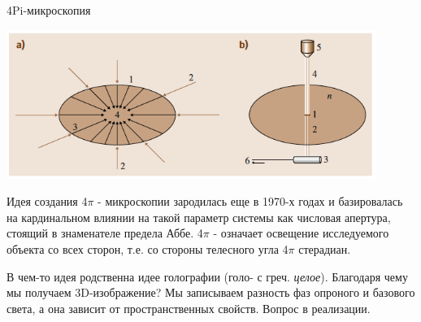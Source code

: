 \documentclass[9pt, compress, xcolor=table]{beamer}
\begin{document}
\begin{frame}{4Pi-микроскопия}
\begin{center}
\includegraphics[width=0.9\textwidth]{ffm01}

Идея создания 4$\pi$ - микроскопии зародилась еще в 1970-х годах и базировалась на кардинальном влиянии на такой параметр системы как числовая апертура, стоящий в знаменателе предела Аббе. 4$\pi$ - означает освещение исследуемого объекта со всех сторон, т.е. со стороны телесного угла 4$\pi$ стерадиан.  

В чем-то идея родственна идее голографии (голо- с греч. \textit{целое}). Благодаря чему мы получаем 3D-изображение? Мы записываем разность фаз опроного и базового света, а она зависит от пространственных свойств. Вопрос в реализации.
\end{center}
\end{frame}
\end{document}
